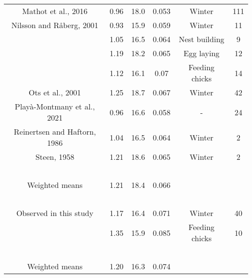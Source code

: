 \documentclass[10pt, twoside]{book} %
\begin{document}
\begin{table}[!ht]
\begin{adjustbox}{max width=\textwidth}
\begin{tabular}{cccccc}
        Mathot et al., 2016 & 0.96 & 18.0 & 0.053 & Winter & 111 \\ 
        Nilsson and Råberg, 2001 & 0.93 & 15.9 & 0.059 & Winter & 11 \\ 
        ~ & 1.05 & 16.5 & 0.064 & Nest building & 9 \\ 
        ~ & 1.19 & 18.2 & 0.065 & Egg laying & 12 \\ 
        ~ & 1.12 & 16.1 & 0.07 & Feeding chicks & 14 \\ 
        Ots et al., 2001 & 1.25 & 18.7 & 0.067 & Winter & 42 \\ 
        Playà-Montmany et al., 2021 & 0.96 & 16.6 & 0.058 & - & 24 \\ 
        Reinertsen and Haftorn, 1986 & 1.04 & 16.5 & 0.064 & Winter & 2 \\ 
        Steen, 1958 & 1.21 & 18.6 & 0.065 & Winter & 2 \\ 
        ~ & ~ & ~ & ~ & ~ & ~ \\ 
        Weighted means & 1.21 & 18.4 & 0.066 & ~ & ~ \\ 
        ~ & ~ & ~ & ~ & ~ & ~ \\ 
        Observed in this study & 1.17 & 16.4 & 0.071 & Winter & 40 \\ 
        ~ & 1.35 & 15.9 & 0.085 & Feeding chicks & 10 \\ 
        ~ & ~ & ~ & ~ & ~ & ~ \\ 
              Weighted means & 1.20 &            16.3 &            0.074 & ~ & ~ \\ \hline
    \end{tabular}
\end{adjustbox}
\end{table}

\clearpage
\end{document}
